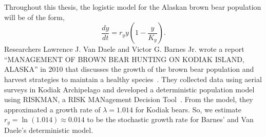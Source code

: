 Throughout this thesis, the logistic model for the Alaskan brown bear population will be of the form,
\begin{equation}\label{eq:LogBear}
    \frac{dy}{dt} = r_yy\left(1-\frac{y}{K_y}\right).
\end{equation}
Researchers Lawrence J. Van Daele and Victor G. Barnes Jr. wrote a report ``MANAGEMENT OF BROWN BEAR HUNTING ON KODIAK ISLAND, A\-L\-A\-S\-K\-A'' in 2010 that discusses the growth of the brown bear population and harvest strategies to maintain a healthy species~\cite{daele2010management}.
They collected data using aerial surveys in Kodiak Archipelago and developed a deterministic population model using RISKMAN, a RISK MANagement Decision Tool~\cite{daele2010management,deterministic}. From the model, they approximated a growth rate of $\lambda=1.014$ for Kodiak bears.
So, we estimate $r_y=\ln(1.014)\approx0.014$ to be the stochastic growth rate for Barnes' and Van Daele's deterministic model.

% 

